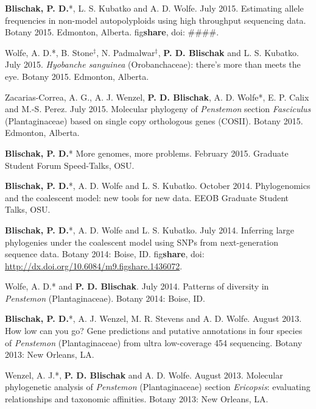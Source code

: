 \documentclass[]{article}
\begin{document}
\begin{etaremune}
\def\labelenumi{\arabic{enumi}.}
\item
  \textbf{Blischak, P. D.}*, L. S. Kubatko and A. D. Wolfe. July 2015.
  Estimating allele frequencies in non-model autopolyploids using high
  throughput sequencing data. Botany 2015. Edmonton, Alberta.
  fig\textbf{share}, doi: \#\#\#\#.
\item
  Wolfe, A. D.*, B. Stone\(^{\ddagger}\), N. Padmalwar\(^{\ddagger}\),
  \textbf{P. D. Blischak} and L. S. Kubatko. July 2015. \emph{Hyobanche
  sanguinea} (Orobanchaceae): there's more than meets the eye. Botany
  2015. Edmonton, Alberta.
\item
  Zacarias-Correa, A. G., A. J. Wenzel, \textbf{P. D. Blischak}, A. D.
  Wolfe*, E. P. Calix and M.-S. Perez. July 2015. Molecular phylogeny of
  \emph{Penstemon} section \emph{Fasciculus} (Plantaginaceae) based on
  single copy orthologous genes (COSII). Botany 2015. Edmonton, Alberta.
\item
  \textbf{Blischak, P. D.}* More genomes, more problems. February 2015.
  Graduate Student Forum Speed-Talks, OSU.
\item
  \textbf{Blischak, P. D.}*, A. D. Wolfe and L. S. Kubatko. October
  2014. Phylogenomics and the coalescent model: new tools for new data.
  EEOB Graduate Student Talks, OSU.
\item
  \textbf{Blischak, P. D.}*, A. D. Wolfe and L. S. Kubatko. July 2014.
  Inferring large phylogenies under the coalescent model using SNPs from
  next-generation sequence data. Botany 2014: Boise, ID.
  fig\textbf{share}, doi:
  \href{http://dx.doi.org/10.6084/m9.figshare.1436072}{\url{http://dx.doi.org/10.6084/m9.figshare.1436072}}.
\item
  Wolfe, A. D.* and \textbf{P. D. Blischak}. July 2014. Patterns of
  diversity in \emph{Penstemon} (Plantaginaceae). Botany 2014: Boise,
  ID.
\item
  \textbf{Blischak, P. D.}*, A. J. Wenzel, M. R. Stevens and A. D.
  Wolfe. August 2013. How low can you go? Gene predictions and putative
  annotations in four species of \emph{Penstemon} (Plantaginaceae) from
  ultra low-coverage 454 sequencing. Botany 2013: New Orleans, LA.
\item
  Wenzel, A. J.*, \textbf{P. D. Blischak} and A. D. Wolfe. August 2013.
  Molecular phylogenetic analysis of \emph{Penstemon} (Plantaginaceae)
  section \emph{Ericopsis}: evaluating relationships and taxonomic
  affinities. Botany 2013: New Orleans, LA.
\end{etaremune}
\end{document}
